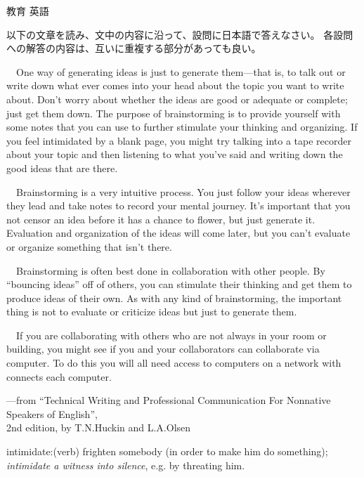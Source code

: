 \documentclass[fleqn]{jbook}
\begin{document}
\begin{question}{教育 英語}{}
\begin{subquestions}
\newpage
\SubQuestion

  以下の文章を読み、文中の内容に沿って、設問に日本語で答えなさい。
  各設問への解答の内容は、互いに重複する部分があっても良い。
\baselineskip=12pt

  　One way of generating ideas is just to generate them---that is,
  to talk out or write down what ever comes into your head about the
  topic you want to write about. Don't worry about whether the ideas
  are good or adequate or complete; just get them down. The purpose
  of brainstorming is to provide yourself with some notes that you
  can use to further stimulate your thinking and organizing. If you
  feel intimidated by a blank page, you might try talking into a tape
  recorder about your topic and then listening to what you've said
  and writing down the good ideas that are there.

  　Brainstorming is a very intuitive process. You just follow your
  ideas wherever they lead and take notes to record your mental
  journey. It's important that you not censor an idea before it has a
  chance to flower, but just generate it. Evaluation and organization
  of the ideas will come later, but you can't evaluate or organize
  something that isn't there.

  　Brainstorming is often best done in collaboration with other
  people. By ``bouncing ideas'' off of others, you can stimulate their
  thinking and get them to produce ideas of their own. As with any
  kind of brainstorming, the important thing is not to evaluate or
  criticize ideas but just to generate them.

  　If you are collaborating with others who are not always in your
  room or building, you might see if you and your collaborators can
  collaborate via computer. To do this you will all need access to
  computers on a network with connects each computer.
%
  \begin{flushright}
  ---from ``Technical Writing and Professional Communication%
     For Nonnative Speakers of English'',\\
     2nd edition, by T.N.Huckin and L.A.Olsen
  \end{flushright}
%
\begin{list}{}{\itemindent=0mm  \leftmargin=28mm
\topsep=0mm \itemsep=0mm \parsep=0mm}
\item[intimidate:(verb)\hfill]
frighten somebody (in order to make him do something);
{\it intimidate a witness into silence}, e.g. by threating him.


\end{list}
\end{subquestions}
\end{question}
\end{document}
